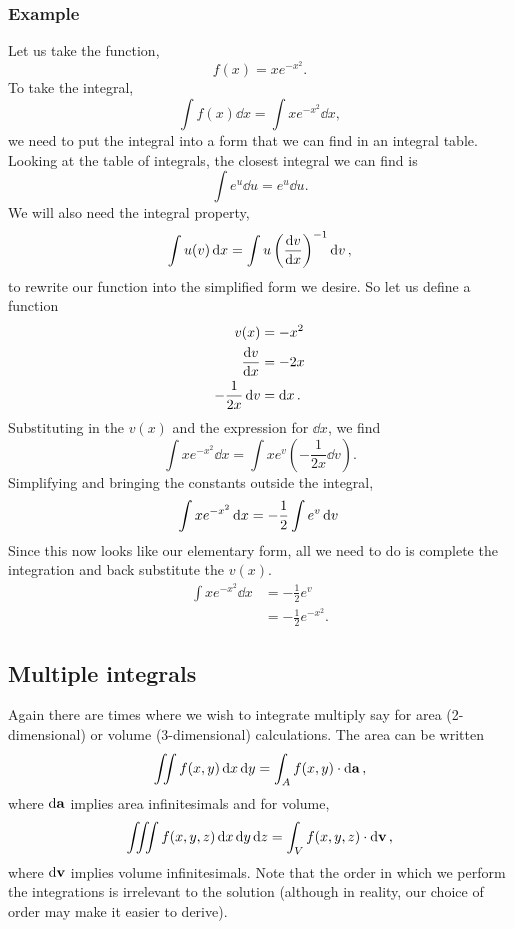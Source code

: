 \subsubsection{Example}
Let us take the function,
\begin{equation*}
    f(x) = x e^{-x^2} .
\end{equation*}
To take the integral,
\begin{equation*}
    \int f(x) \dd{x} = \int x e^{-x^2} \dd{x} ,
\end{equation*}
we need to put the integral into a form that we can find in an integral table.
Looking at the table of integrals, the closest integral we can find is
\begin{equation*}
    \int e^u \dd{u} = e^u \dd{u} .
\end{equation*}
We will also need the integral property,
\begin{equation}
    \int u(v) \dd{x} = \int u \left(\dv{v}{x}\right)^{-1} \dd{v} ,
\end{equation}
to rewrite our function into the simplified form we desire.  So let us define a
function
\begin{align*}
    v(x) &= -x^2 \\
    \dv{v}{x} &= -2x \\
    - \frac{1}{2x} \dd{v} &= \dd{x} .
\end{align*}
Substituting in the $v(x)$ and the expression for $\dd{x}$, we find 
\begin{equation*}
    \int x e^{-x^2} \dd{x} = \int x e^{v} \left( - \frac{1}{2x} \dd{v} \right) .
\end{equation*}
Simplifying and bringing the constants outside the integral,
\begin{equation*}
    \int x e^{-x^2} \dd{x} = - \frac{1}{2} \int e^{v} \dd{v} \\
\end{equation*}
Since this now looks like our elementary form, all we need to do is complete the
integration and back substitute the $v(x)$.
\begin{align*}
    \int x e^{-x^2} \dd{x} &= - \frac{1}{2} e^{v} \\
    &= - \frac{1}{2} e^{-x^2} .
\end{align*}


\subsection{Multiple integrals}
Again there are times where we wish to integrate multiply say for area
(2-dimensional) or volume (3-dimensional) calculations.  The area can be written
\begin{equation}
    \iint f(x,y) \dd{x} \dd{y} = \int_{A} f(x,y) \cdot \dd{\vb{a}},
\end{equation}
where $\dd{\vb{a}}$ implies area infinitesimals and for volume,
\begin{equation}
    \iiint f(x,y,z) \dd{x} \dd{y} \dd{z} = \int_{V} f(x,y,z) \cdot \dd{\vb{v}},
\end{equation}
where $\dd{\vb{v}}$ implies volume infinitesimals.  Note that the order in which
we perform the integrations is irrelevant to the solution (although in reality,
our choice of order may make it easier to derive).

